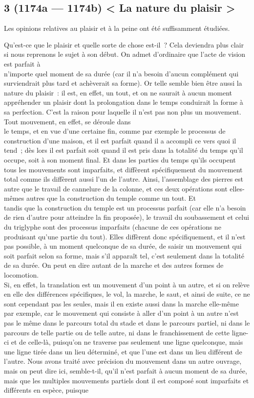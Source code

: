 \documentclass[french,twoside]{book} %
\begin{document}
\subsection[{3 (1174a — 1174b) < La nature du plaisir >}]{3 (1174a — 1174b) < La nature du plaisir >}
\noindent Les opinions relatives au plaisir et à la peine ont été suffisamment étudiées.\par
Qu’est-ce que le plaisir et quelle sorte de chose est-il ? Cela deviendra plus clair si nous reprenons le sujet à son début. On admet d’ordinaire que l’acte de vision est parfait à \\
n’importe quel moment de sa durée (car il n’a besoin d’aucun complément qui surviendrait plus tard et achèverait sa forme). Or telle semble bien être aussi la nature du plaisir : il est, en effet, un tout, et on ne saurait à aucun moment appréhender un plaisir dont la prolongation dans le temps conduirait la forme à sa perfection. C’est la raison pour laquelle il n’est pas non plus un mouvement. Tout mouvement, en effet, se déroule dans \\
le temps, et en vue d’une certaine fin, comme par exemple le processus de construction d’une maison, et il est parfait quand il a accompli ce vers quoi il tend ; dès lors il est parfait soit quand il est pris dans la totalité du temps qu’il occupe, soit à son moment final. Et dans les parties du temps qu’ils occupent tous les mouvements sont imparfaits, et diffèrent spécifiquement du mouvement total comme ils diffèrent aussi l’un de l’autre. Ainsi, l’assemblage des pierres est autre que le travail de cannelure de la colonne, et ces deux opérations sont elles-mêmes autres que la construction du temple comme un tout. Et \\
tandis que la construction du temple est un processus parfait (car elle n’a besoin de rien d’autre pour atteindre la fin proposée), le travail du soubassement et celui du triglyphe sont des processus imparfaits (chacune de ces opérations ne produisant qu’une partie du tout). Elles diffèrent donc spécifiquement, et il n’est pas possible, à un moment quelconque de sa durée, de saisir un mouvement qui soit parfait selon sa forme, mais s’il apparaît tel, c’est seulement dans la totalité de sa durée. On peut en dire autant de la marche et des autres formes de locomotion. \\
Si, en effet, la translation est un mouvement d’un point à un autre, et si on relève en elle des différences spécifiques, le vol, la marche, le saut, et ainsi de suite, ce ne sont cependant pas les seules, mais il en existe aussi dans la marche elle-même par exemple, car le mouvement qui consiste à aller d’un point à un autre n’est pas le même dans le parcours total du stade et dans le parcours partiel, ni dans le parcours de telle partie ou de telle autre, ni dans le franchissement de cette ligne-ci  et de celle-là, puisqu’on ne traverse pas seulement une ligne quelconque, mais une ligne tirée dans un lieu déterminé, et que l’une est dans un lieu différent de l’autre. Nous avons traité avec précision du mouvement dans un autre ouvrage, mais on peut dire ici, semble-t-il, qu’il n’est parfait à aucun moment de sa durée, mais que les multiples mouvements partiels dont il est composé sont imparfaits et différents en espèce, puisque \\
\end{document}
